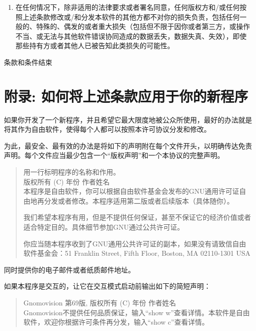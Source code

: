 \documentclass[11pt]{article}
\begin{document}
\begin{enumerate}
\item
{\sc 在任何情况下，除非适用的法律要求或者署名同意，任何版权方和/或任何按照上述条款修改或/和分发本软件的其他方都不对你的损失负责，包括任何一般的、特殊的、偶发的或者重大损失（包括但不限于因你或者第三方，或操作不当、或无法与其他软件错误协同造成的数据丢失，数据失真、失效），即使那些持有方或者其他人已被告知此类损失的可能性。}

\end{enumerate}


\begin{center}
{\Large\sc 条款和条件结束}
\end{center}


\pagebreak[2]

\section*{附录: 如何将上述条款应用于你的新程序}

如果你开发了一个新程序，并且希望它最大限度地被公众所使用，最好的办法就是将其作为自由软件，使得每个人都可以按照本许可协议分发和修改。

为此，最安全、最有效的办法是将如下的声明附在每个文件开头，以明确传达免责声明。每个文件应当最少包含一个“版权声明”和一个本协议的完整声明。

\begin{quote}
用一行标明程序的名称和作用。 \\
版权所有 (C) 年份  作者姓名 \\

本程序是自由软件，你可以根据自由软件基金会发布的GNU通用许可证自由地再分发或者修改。本程序适用第二版或者后续版本（具体随你）。

我们希望本程序有用，但是不提供任何保证，甚至不保证它的经济价值或者适合特定目的。具体细节参加GNU通过公共许可证。

你应当随本程序收到了GNU通用公共许可证的副本，如果没有请致信自由软件基金会：51 Franklin Street, Fifth Floor, Boston, MA 02110-1301 USA
\end{quote}

同时提供你的电子邮件或者纸质邮件地址。

如果本程序是交互的，让它在交互模式启动前输出如下的简短声明：


\begin{quote}
Gnomovision 第69版, 版权所有 (C) 年份  作者姓名 \\
Gnomovision不提供任何品质保证，输入“show w”查看详情。本软件是自由软件，欢迎你根据许可条件再分发，输入“show c”查看详情。
\end{quote}
\end{document}
